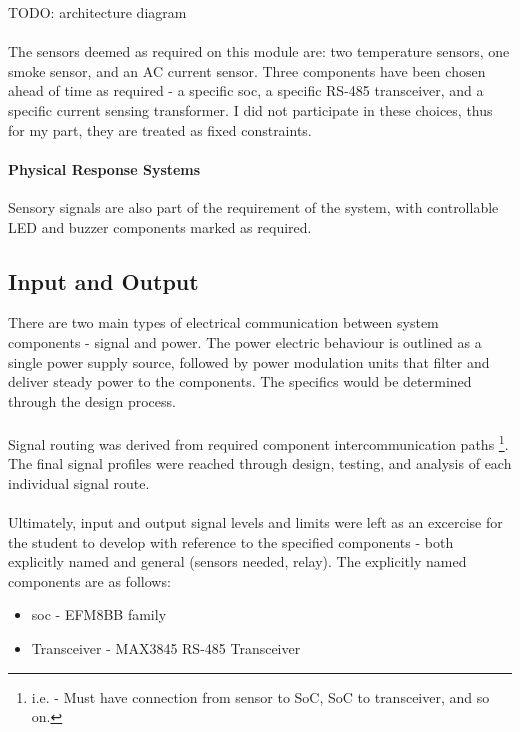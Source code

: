 \documentclass[12pt]{article}
\begin{document}
    TODO: architecture diagram

    \paragraph{}
    The sensors deemed as required on this module are: two temperature sensors, one smoke sensor, and an AC current sensor. Three components have been chosen ahead of time as required - a specific \acrfull{soc}, a specific RS-485 transceiver, and a specific current sensing transformer. I did not participate in these choices, thus for my part, they are treated as fixed constraints.

    \paragraph{Physical Response Systems}
    Sensory signals are also part of the requirement of the system, with controllable LED and buzzer components marked as required.

  \subsection{Input and Output} 
  There are two main types of electrical communication between system components - signal and power. The power electric behaviour is outlined as a single power supply source, followed by power modulation units that filter and deliver steady power to the components. The specifics would be determined through the design process.

  \paragraph{}
  Signal routing was derived from required component intercommunication paths \footnote{i.e. - Must have connection from sensor to SoC, SoC to transceiver, and so on.}. The final signal profiles were reached through design, testing, and analysis of each individual signal route.

  \paragraph{}
  Ultimately, input and output signal levels and limits were left as an excercise for the student to develop with reference to the specified components - both explicitly named and general (sensors needed, relay). The explicitly named components are as follows:

  \begin{itemize}
  \item \acrlong{soc} - EFM8BB family
  \item Transceiver - MAX3845 RS-485 Transceiver
  \end{itemize}
  
\end{document}
